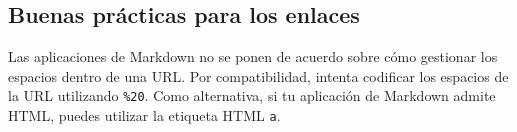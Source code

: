 \documentclass[11pt,a4paper]{article}
\theoremstyle{exercise}
\begin{document}
%
%
%
%
%
%
%
%
%
%
%









\subsection{Buenas prácticas para los enlaces}

Las aplicaciones de Markdown no se ponen de acuerdo sobre cómo gestionar los espacios dentro de una URL. Por compatibilidad, intenta codificar los espacios de la URL utilizando \verb|%20|. Como alternativa, si tu aplicación de Markdown admite HTML, puedes utilizar la etiqueta HTML \verb|a|.
\end{document}
